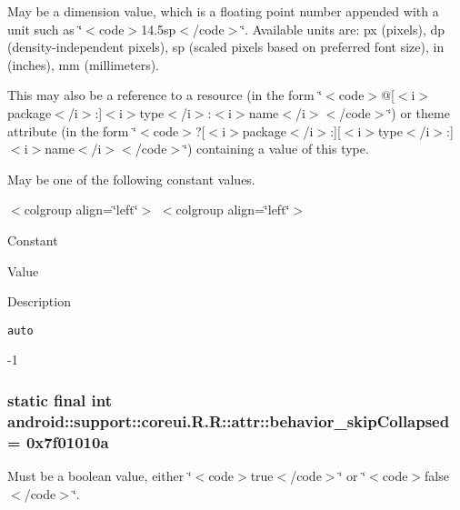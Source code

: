 May be a dimension value, which is a floating point number appended with a unit such as \char`\"{}$<$code$>$14.5sp$<$/code$>$\char`\"{}. Available units are: px (pixels), dp (density-independent pixels), sp (scaled pixels based on preferred font size), in (inches), mm (millimeters). 

This may also be a reference to a resource (in the form \char`\"{}$<$code$>$@\mbox{[}$<$i$>$package$<$/i$>$:\mbox{]}$<$i$>$type$<$/i$>$:$<$i$>$name$<$/i$>$$<$/code$>$\char`\"{}) or theme attribute (in the form \char`\"{}$<$code$>$?\mbox{[}$<$i$>$package$<$/i$>$:\mbox{]}\mbox{[}$<$i$>$type$<$/i$>$:\mbox{]}$<$i$>$name$<$/i$>$$<$/code$>$\char`\"{}) containing a value of this type. 

May be one of the following constant values. \begin{TabularC}{0}
\hline
\end{TabularC}
$<$colgroup align=\char`\"{}left\char`\"{}$>$ $<$colgroup align=\char`\"{}left\char`\"{}$>$ 

Constant

Value

Description 

{\tt auto}

-1\hypertarget{classandroid_1_1support_1_1coreui_1_1_r_1_1attr_d937a921f4abdc344b416df832b564aa}{
\subsubsection[{behavior\_\-skipCollapsed}]{\setlength{\rightskip}{0pt plus 5cm}static final int android::support::coreui.R.R::attr::behavior\_\-skipCollapsed = 0x7f01010a}}
\label{classandroid_1_1support_1_1coreui_1_1_r_1_1attr_d937a921f4abdc344b416df832b564aa}


Must be a boolean value, either \char`\"{}$<$code$>$true$<$/code$>$\char`\"{} or \char`\"{}$<$code$>$false$<$/code$>$\char`\"{}. 

